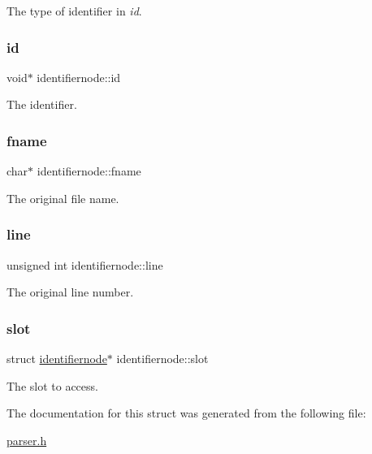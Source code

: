 The type of identifier in {\itshape id}. \mbox{\label{structidentifiernode_a729df89140813a04c3f31e1f7087628a}} 
\subsubsection{\texorpdfstring{id}{id}}
{\footnotesize\ttfamily void$\ast$ identifiernode\+::id}

The identifier. \mbox{\label{structidentifiernode_a45fcf75373defb65130557413dedec2d}} 
\subsubsection{\texorpdfstring{fname}{fname}}
{\footnotesize\ttfamily char$\ast$ identifiernode\+::fname}

The original file name. \mbox{\label{structidentifiernode_a6da5e6724ff8e4ffeeda6d56f6a64168}} 
\subsubsection{\texorpdfstring{line}{line}}
{\footnotesize\ttfamily unsigned int identifiernode\+::line}

The original line number. \mbox{\label{structidentifiernode_a6093288822da9ec5ff1f3287927c99ad}} 
\subsubsection{\texorpdfstring{slot}{slot}}
{\footnotesize\ttfamily struct \hyperlink{structidentifiernode}{identifiernode}$\ast$ identifiernode\+::slot}

The slot to access. 

The documentation for this struct was generated from the following file\+:\begin{DoxyCompactItemize}
\item 
\hyperlink{parser_8h}{parser.\+h}\end{DoxyCompactItemize}
